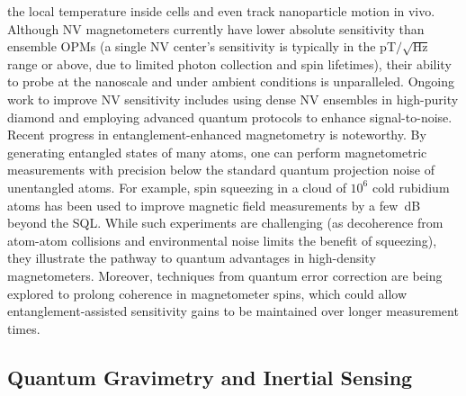 \documentclass[12pt]{article}
\begin{document}
the local temperature inside cells and even track nanoparticle motion
in vivo\cite{Schirhagl2014}. Although NV magnetometers currently have
lower absolute sensitivity than ensemble OPMs (a single NV center’s
sensitivity is typically in the pT$/\sqrt{\text{Hz}}$ range or above,
due to limited photon collection and spin lifetimes), their ability to
probe at the nanoscale and under ambient conditions is
unparalleled. Ongoing work to improve NV sensitivity includes using
dense NV ensembles in high-purity diamond and employing advanced
quantum protocols to enhance signal-to-noise.    Recent progress in
entanglement-enhanced magnetometry is noteworthy. By generating
entangled states of many atoms, one can perform magnetometric
measurements with precision below the standard quantum projection
noise of unentangled atoms. For example, spin squeezing in a cloud of
$10^6$ cold rubidium atoms has been used to improve magnetic field
measurements by a few~dB beyond the SQL. While such experiments are
challenging (as decoherence from atom-atom collisions and
environmental noise limits the benefit of squeezing), they illustrate
the pathway to quantum advantages in high-density
magnetometers. Moreover, techniques from quantum error correction are
being explored to prolong coherence in magnetometer spins, which could
allow entanglement-assisted sensitivity gains to be maintained over
longer measurement times.   

\subsection{Quantum Gravimetry and Inertial Sensing}
\end{document}
